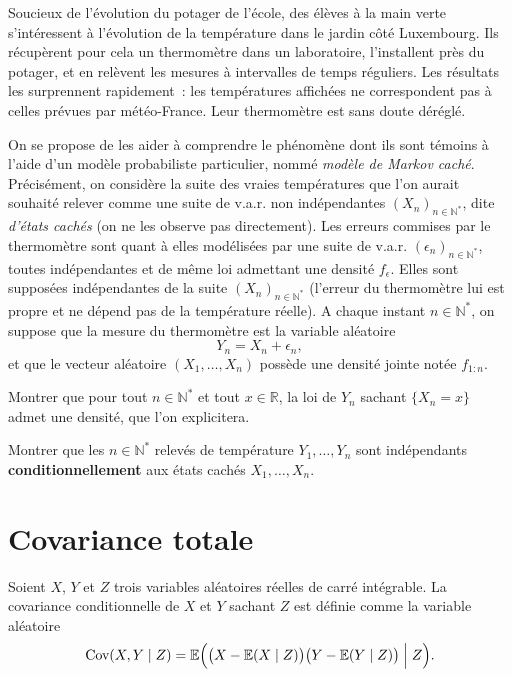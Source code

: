 Soucieux de l'évolution du potager de l'école, des élèves à la main
verte s'intéressent à l'évolution de la température dans le jardin côté
Luxembourg. Ils récupèrent pour cela un thermomètre dans un laboratoire,
l'installent près du potager, et en relèvent les mesures à intervalles
de temps réguliers. Les résultats les surprennent rapidement~: les
températures affichées ne correspondent pas à celles prévues par
météo-France. Leur thermomètre est sans doute déréglé.

On se propose de les aider à comprendre le phénomène dont ils sont
témoins à l'aide d'un modèle probabiliste particulier, nommé
\emph{modèle de Markov caché}. Précisément, on considère la suite des
vraies températures que l'on aurait souhaité relever comme une suite de
v.a.r. non indépendantes \((X_n)_{n\in\mathbb{N}^\ast}\), dite
\emph{d'états cachés} (on ne les observe pas directement). Les erreurs
commises par le thermomètre sont quant à elles modélisées par une suite
de v.a.r. \((\epsilon_n)_{n\in\mathbb{N}^\ast}\), toutes indépendantes
et de même loi admettant une densité \(f_\epsilon\). Elles sont
supposées indépendantes de la suite \((X_n)_{n\in\mathbb{N}^\ast}\)
(l'erreur du thermomètre lui est propre et ne dépend pas de la
température réelle). A chaque instant \(n\in\mathbb{N}^\ast\), on
suppose que la mesure du thermomètre est la variable aléatoire
\[Y_n = X_n + \epsilon_n,\] et que le vecteur aléatoire
\((X_1,\dots,X_n)\) possède une densité jointe notée \(f_{1:n}\).

\label{III-ec1}
Montrer que pour tout \(n \in \mathbb{N}^\ast\) et tout
\(x\in\mathbb{R}\), la loi de \(Y_n\) sachant \(\{X_n = x\}\) admet une
densité, que l'on explicitera.

\label{III-ec2}
Montrer que les \(n\in\mathbb{N}^\ast\) relevés de température
\(Y_1,\dots,Y_n\) sont indépendants \textbf{conditionnellement} aux
états cachés \(X_1,\dots,X_n\).

\section{Covariance totale}\label{III-covtot}

Soient \(X\), \(Y\) et \(Z\) trois variables aléatoires réelles de carré
intégrable. La covariance conditionnelle de \(X\) et \(Y\) sachant \(Z\)
est définie comme la variable aléatoire
\[\text{Cov}(X,Y \mid Z) = \mathbb{E}\Bigl( \bigl( X - \mathbb{E}(X\mid Z) \bigr)\bigl( Y - \mathbb{E}(Y\mid Z) \bigr) \Bigm| Z  \Bigr).\]

